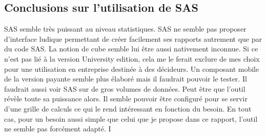 \subsection{Conclusions sur l'utilisation de SAS}
SAS semble très puissant au niveau statistiques. SAS ne semble pas proposer d'interface ludique permettant de créer facilement ses rapports autrement que par du code SAS. La notion de cube semble lui être aussi nativement inconnue. Si ce n'est pas lié à la version University edition, cela me le ferait exclure de mes choix pour une utilisation en entreprise destinée à des décideurs. Un composant mobile de la version payante semble plus élaboré mais il faudrait pouvoir le tester. Il faudrait aussi voir SAS sur de gros volumes de données. Peut être que l'outil révèle toute sa puissance alors. Il semble pouvoir être configuré pour se servir d'une grille de calculs ce qui le rend intéressant en fonction du besoin. En tout cas, pour un besoin aussi simple que celui que je propose dans ce rapport, l'outil ne semble pas forcément adapté. I 

\clearpage